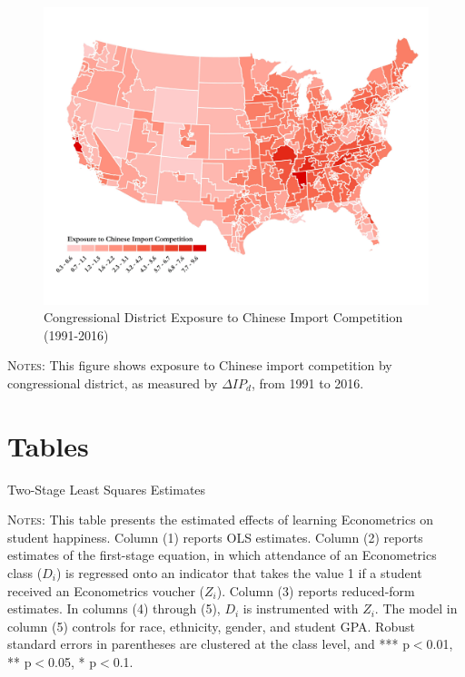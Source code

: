 \documentclass[12pt,notitlepage]{article}
\begin{document}
\begin{figure}[H]
	\begin{center}
		\caption{Congressional District Exposure to Chinese Import Competition (1991-2016)}
		\vspace{-6mm}
		\includegraphics[width=0.8\linewidth]{map_ip_district.pdf}
	\end{center}
\end{figure}
\vspace{-13mm}
\begin{footnotesize}
	\begin{spacing}{1}
		\textsc{Notes}: This figure shows exposure to Chinese import competition by congressional district, as measured by $\Delta IP_{d}$, from 1991 to 2016.
	\end{spacing}
\end{footnotesize}

\newpage

\section*{Tables}

\begin{table}[H]
	\begin{center}
		\caption{Two-Stage Least Squares Estimates}
			
	\end{center}
\end{table}
\vspace{-6mm}
\begin{footnotesize}
	\begin{spacing}{1}
		\textsc{Notes}: This table presents the estimated effects of learning Econometrics on student happiness. Column (1) reports OLS estimates. Column (2) reports estimates of the first-stage equation, in which attendance of an Econometrics class ($D_i$) is regressed onto an indicator that takes the value 1 if a student received an Econometrics voucher ($Z_i$). Column (3) reports reduced-form estimates. In columns (4) through (5), $D_i$ is instrumented with $Z_i$. The model in column (5) controls for race, ethnicity, gender, and student GPA. Robust standard errors in parentheses are clustered at the class level, and *** p$<$0.01, ** p$<$0.05, * p$<$0.1.
	\end{spacing}
\end{footnotesize}
\end{document}
